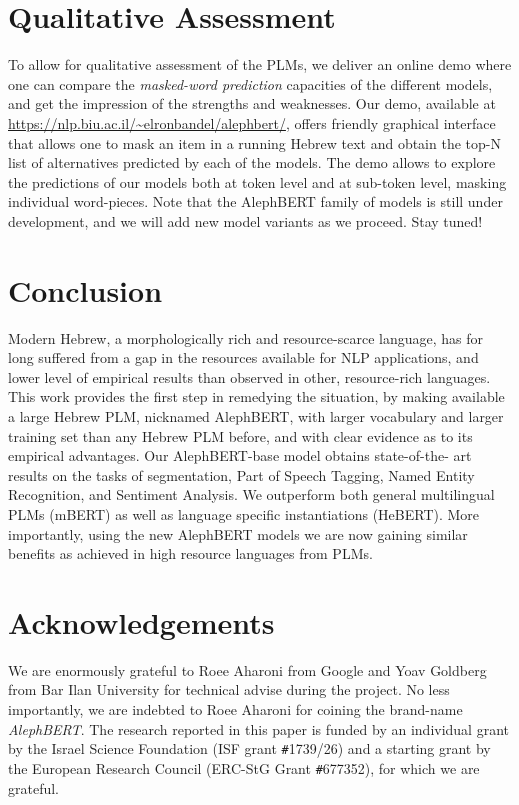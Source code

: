 \documentclass[11pt,a4paper]{article}
\begin{document}
\section{Qualitative Assessment}
To allow for qualitative assessment of the PLMs, we deliver an online demo where one can compare the {\em masked-word prediction} capacities of the different models, and get the impression of the strengths and weaknesses. 
Our demo, available at \url{https://nlp.biu.ac.il/~elronbandel/alephbert/}, offers friendly graphical interface that allows one to mask an item in a running Hebrew text and obtain the top-N list of alternatives predicted by each of the models. The demo allows to explore the predictions of our models both at token level and at sub-token level, masking individual word-pieces. 
Note that the {AlephBERT} family of models is still under development, and we will add new model variants as we proceed. Stay tuned!



\section{Conclusion}

Modern Hebrew, a morphologically rich and resource-scarce language, has for long suffered from a gap in the resources available for NLP applications, and lower level of empirical results than observed in other,  resource-rich languages. This work provides the first step in remedying the situation, by making available a large Hebrew PLM, nicknamed {AlephBERT}, with larger vocabulary and larger training set than any Hebrew PLM before, and with clear evidence as to its empirical advantages.
Our  {AlephBERT}-base model obtains state-of-the-
art results on the tasks of  segmentation, Part of Speech Tagging, Named Entity Recognition, and Sentiment Analysis. We outperform both general multilingual PLMs (mBERT) as well as language specific instantiations (HeBERT). 
More importantly, using the new AlephBERT models we are now gaining similar benefits as achieved in high resource languages from PLMs.


\section{Acknowledgements}
We are enormously grateful to Roee Aharoni from Google and Yoav Goldberg from Bar Ilan University for technical advise during the project. No less importantly, we are indebted to Roee Aharoni for coining the brand-name {\em AlephBERT}. The research reported in this paper is funded by an individual grant by the Israel Science Foundation (ISF grant \verb|#|1739/26) and a starting grant by the European Research Council (ERC-StG Grant \verb|#|677352), for which we are grateful.
\end{document}
